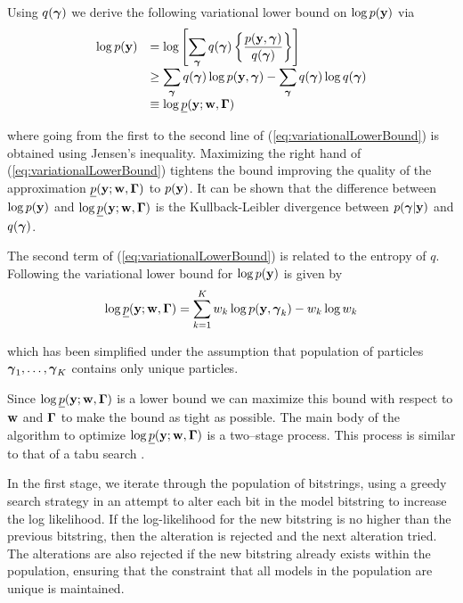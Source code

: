 Using $q({\boldsymbol \gamma})$ we derive the following variational lower bound on $\log
p({\bf y})$ via
\begin{equation}
\label{eq:variationalLowerBound}
\begin{array}{rl}
\displaystyle \log p({\bf y}) 
& \displaystyle = \log \left[ \sum_{{\boldsymbol \gamma}} q({\boldsymbol \gamma}) \left\{  \frac{p({\bf y},{\boldsymbol \gamma})}{q({\boldsymbol \gamma}) } \right\} \right]
\\
& \displaystyle \ge \sum_{{\boldsymbol \gamma}} q({\boldsymbol \gamma}) \log p({\bf y},{\boldsymbol \gamma}) 
- \sum_{{\boldsymbol \gamma}} q({\boldsymbol \gamma}) \log q({\boldsymbol \gamma})
\\
& \displaystyle \equiv \log \underline{p}({\bf y};{\bf w},{\boldsymbol \Gamma})
\end{array}
\end{equation}

\noindent where going from the first to the second line of
(\ref{eq:variationalLowerBound}) is obtained using Jensen's inequality.
Maximizing the right hand  of (\ref{eq:variationalLowerBound}) tightens the
bound improving the quality of the approximation
$\underline{p}({\bf y};{\bf w},{\boldsymbol \Gamma})$ to $p({\bf y})$. It can be shown that the
difference between $\log p({\bf y})$ and $\log \underline{p}({\bf y};{\bf w},{\boldsymbol \Gamma})$ is
the Kullback-Leibler divergence between $p({\boldsymbol \gamma}|{\bf y})$ and $q({\boldsymbol \gamma})$.

The second term of (\ref{eq:variationalLowerBound}) is related to the entropy
of $q$. Following \cite{Rockova2017} the variational lower bound for $\log
p({\bf y})$ is given by
\begin{equation}\label{eq:objective}
\displaystyle \log \underline{p}({\bf y};{\bf w},{\boldsymbol \Gamma}) 
= \sum_{k=1}^K w_k\log p({\bf y},{\boldsymbol \gamma}_k) - w_k \log w_k
\end{equation}

\noindent which has been simplified under the assumption that population of
particles ${\boldsymbol \gamma}_1,\ldots,{\boldsymbol \gamma}_K$ contains only unique particles.

Since $\log \underline{p}({\bf y};{\bf w},{\boldsymbol \Gamma})$ is a lower bound we can maximize
this bound with respect to ${\bf w}$ and ${\boldsymbol \Gamma}$ to make the bound as tight as
possible.  The main body of the algorithm to optimize $\log
\underline{p}({\bf y};{\bf w},{\boldsymbol \Gamma})$ is a two--stage process. 
This process is similar to that of a tabu search
\cite{Glover1986}.


In the first stage, we iterate through the population of bitstrings, using a
greedy search strategy in an attempt to alter each bit in the model bitstring
to increase the log likelihood. If the log-likelihood for the new bitstring is
no higher than the previous bitstring, then the alteration is rejected and the
next alteration tried. The alterations are also rejected if the new bitstring
already exists within the population, ensuring that the constraint that all
models in the population are unique is maintained.

